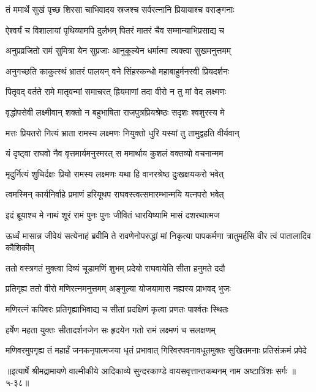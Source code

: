 \twolineshloka
{तं ममार्थे सुखं पृच्छ शिरसा चाभिवादय}
{स्रजश्च सर्वरत्नानि प्रियायाश्च वराङ्गनाः} %

\twolineshloka
{ऐश्वर्यं च विशालायां पृथिव्यामपि दुर्लभम्}
{पितरं मातरं चैव सम्मान्याभिप्रसाद्य च} %

\twolineshloka
{अनुप्रव्रजितो रामं सुमित्रा येन सुप्रजाः}
{आनुकूल्येन धर्मात्मा त्यक्त्वा सुखमनुत्तमम्} %

\twolineshloka
{अनुगच्छति काकुत्स्थं भ्रातरं पालयन् वने}
{सिंहस्कन्धो महाबाहुर्मनस्वी प्रियदर्शनः} %

\twolineshloka
{पितृवद् वर्तते रामे मातृवन्मां समाचरत्}
{ह्रियमाणां तदा वीरो न तु मां वेद लक्ष्मणः} %

\twolineshloka
{वृद्धोपसेवी लक्ष्मीवान् शक्तो न बहुभाषिता}
{राजपुत्रप्रियश्रेष्ठः सदृशः श्वशुरस्य मे} %

\twolineshloka
{मत्तः प्रियतरो नित्यं भ्राता रामस्य लक्ष्मणः}
{नियुक्तो धुरि यस्यां तु तामुद्वहति वीर्यवान्} %

\twolineshloka
{यं दृष्ट्वा राघवो नैव वृत्तमार्यमनुस्मरत्}
{स ममार्थाय कुशलं वक्तव्यो वचनान्मम} %

\twolineshloka
{मृदुर्नित्यं शुचिर्दक्षः प्रियो रामस्य लक्ष्मणः}
{यथा हि वानरश्रेष्ठ दुःखक्षयकरो भवेत्} %

\twolineshloka
{त्वमस्मिन् कार्यनिर्वाहे प्रमाणं हरियूथप}
{राघवस्त्वत्समारम्भान्मयि यत्नपरो भवेत्} %

\twolineshloka
{इदं ब्रूयाश्च मे नाथं शूरं रामं पुनः पुनः}
{जीवितं धारयिष्यामि मासं दशरथात्मज} %

\threelineshloka
{ऊर्ध्वं मासान्न जीवेयं सत्येनाहं ब्रवीमि ते}
{रावणेनोपरुद्धां मां निकृत्या पापकर्मणा}
{त्रातुमर्हसि वीर त्वं पातालादिव कौशिकीम्} %

\twolineshloka
{ततो वस्त्रगतं मुक्त्वा दिव्यं चूडामणिं शुभम्}
{प्रदेयो राघवायेति सीता हनुमते ददौ} %

\twolineshloka
{प्रतिगृह्य ततो वीरो मणिरत्नमनुत्तमम्}
{अङ्गुल्या योजयामास नह्यस्य प्राभवद् भुजः} %

\twolineshloka
{मणिरत्नं कपिवरः प्रतिगृह्याभिवाद्य च}
{सीतां प्रदक्षिणं कृत्वा प्रणतः पार्श्वतः स्थितः} %

\twolineshloka
{हर्षेण महता युक्तः सीतादर्शनजेन सः}
{हृदयेन गतो रामं लक्ष्मणं च सलक्षणम्} %

\twolineshloka
{मणिवरमुपगृह्य तं महार्हं जनकनृपात्मजया धृतं प्रभावात्}
{गिरिवरपवनावधूतमुक्तः सुखितमनाः प्रतिसंक्रमं प्रपेदे} %


॥इत्यार्षे श्रीमद्रामायणे वाल्मीकीये आदिकाव्ये सुन्दरकाण्डे वायसवृत्तान्तकथनम् नाम अष्टात्रिंशः सर्गः ॥५-३८॥
